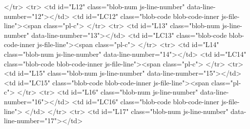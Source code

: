       </tr>
      <tr>
        <td id="L12" class="blob-num js-line-number" data-line-number="12"></td>
        <td id="LC12" class="blob-code blob-code-inner js-file-line"><span class="pl-c">%
      </tr>
      <tr>
        <td id="L13" class="blob-num js-line-number" data-line-number="13"></td>
        <td id="LC13" class="blob-code blob-code-inner js-file-line"><span class="pl-c">%
      </tr>
      <tr>
        <td id="L14" class="blob-num js-line-number" data-line-number="14"></td>
        <td id="LC14" class="blob-code blob-code-inner js-file-line"><span class="pl-c">%
      </tr>
      <tr>
        <td id="L15" class="blob-num js-line-number" data-line-number="15"></td>
        <td id="LC15" class="blob-code blob-code-inner js-file-line"><span class="pl-c">%
      </tr>
      <tr>
        <td id="L16" class="blob-num js-line-number" data-line-number="16"></td>
        <td id="LC16" class="blob-code blob-code-inner js-file-line">
</td>
      </tr>
      <tr>
        <td id="L17" class="blob-num js-line-number" data-line-number="17"></td>
